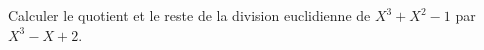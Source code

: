 Calculer le quotient et le reste de la division euclidienne de $X^3+X^2-1$ par $X^3-X+2$.

\bigskip \bigskip